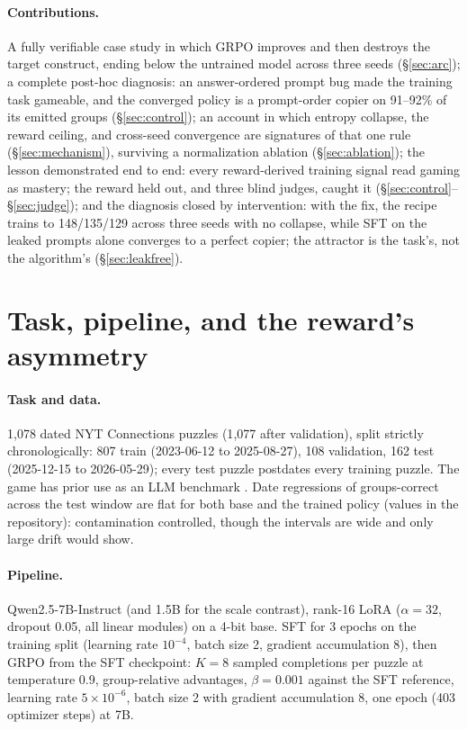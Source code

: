 \documentclass{article}
\begin{document}
\paragraph{Contributions.} A fully verifiable case study in which GRPO
improves and then destroys the target construct, ending below the untrained
model across three seeds (\S\ref{sec:arc}); a complete post-hoc diagnosis:
an answer-ordered prompt bug made the training task gameable, and the
converged policy is a prompt-order copier on 91--92\% of its emitted groups
(\S\ref{sec:control}); an account in which entropy collapse, the reward
ceiling, and cross-seed convergence are signatures of that one rule
(\S\ref{sec:mechanism}), surviving a
normalization ablation (\S\ref{sec:ablation}); the lesson demonstrated end to end: every reward-derived training signal read gaming as mastery; the reward held out, and three blind judges, caught it (\S\ref{sec:control}--\S\ref{sec:judge}); and the diagnosis closed by intervention: with the fix, the recipe trains to 148/135/129 across three seeds with no collapse, while SFT on the leaked prompts alone converges to a perfect copier; the attractor is the task's, not the algorithm's (\S\ref{sec:leakfree}).

\section{Task, pipeline, and the reward's asymmetry}
\label{sec:setup}

\paragraph{Task and data.} 1{,}078 dated NYT Connections puzzles (1{,}077
after validation), split strictly chronologically: 807 train (2023-06-12 to
2025-08-27), 108 validation, 162 test (2025-12-15 to 2026-05-29); every
test puzzle postdates every training puzzle. The game has prior use as an LLM benchmark \citep{todd2024}. Date regressions of groups-correct across the test window are flat for both base and the trained policy (values in the repository): contamination controlled, though the intervals are wide and only large drift would show.

\paragraph{Pipeline.} Qwen2.5-7B-Instruct (and 1.5B for the scale contrast),
rank-16 LoRA ($\alpha=32$, dropout 0.05, all linear modules) on a 4-bit base. SFT for 3 epochs on the training split (learning rate $10^{-4}$, batch size 2, gradient accumulation 8), then GRPO \citep{deepseekmath} from the SFT checkpoint: $K=8$ sampled completions per puzzle at temperature 0.9, group-relative advantages, $\beta=0.001$ against the SFT reference, learning rate $5\times10^{-6}$, batch size 2 with gradient accumulation 8, one epoch (403 optimizer steps) at 7B.
\end{document}
